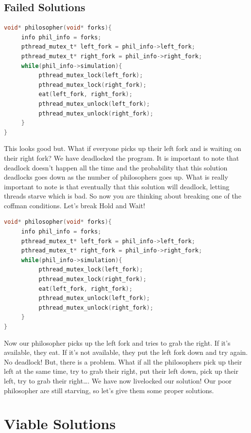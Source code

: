 \subsection{Failed Solutions}

\begin{lstlisting}[language=C]
void* philosopher(void* forks){
     info phil_info = forks;
     pthread_mutex_t* left_fork = phil_info->left_fork;
     pthread_mutex_t* right_fork = phil_info->right_fork;
     while(phil_info->simulation){
          pthread_mutex_lock(left_fork);
          pthread_mutex_lock(right_fork);
          eat(left_fork, right_fork);
          pthread_mutex_unlock(left_fork);
          pthread_mutex_unlock(right_fork);
     }
}
\end{lstlisting}

This looks good but. What if everyone picks up their left fork and is waiting on their right fork? We have deadlocked the program. It is important to note that deadlock doesn't happen all the time and the probability that this solution deadlocks goes down as the number of philosophers goes up. What is really important to note is that eventually that this solution will deadlock, letting threads starve which is bad. So now you are thinking about breaking one of the coffman conditions. Let's break Hold and Wait!

\begin{lstlisting}[language=C]
void* philosopher(void* forks){
     info phil_info = forks;
     pthread_mutex_t* left_fork = phil_info->left_fork;
     pthread_mutex_t* right_fork = phil_info->right_fork;
     while(phil_info->simulation){
          pthread_mutex_lock(left_fork);
          pthread_mutex_lock(right_fork);
          eat(left_fork, right_fork);
          pthread_mutex_unlock(left_fork);
          pthread_mutex_unlock(right_fork);
     }
}
\end{lstlisting}

Now our philosopher picks up the left fork and tries to grab the right.
If it's available, they eat.
If it's not available, they put the left fork down and try again.
No deadlock! But, there is a problem.
What if all the philosophers pick up their left at the same time, try to grab their right, put their left down, pick up their left, try to grab their right\ldots{}.
We have now livelocked our solution! Our poor philosopher are still starving, so let's give them some proper solutions.

\section{Viable Solutions}

